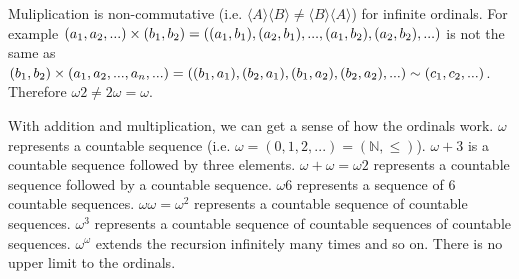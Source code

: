 \documentclass{article}
\def\ordeq{\sim}
\begin{document}

\begin{remark}
	Muliplication is non-commutative (i.e. $\langle A \rangle \langle B \rangle \neq \langle B \rangle \langle A \rangle$) for infinite ordinals. For example $(a_1, a_2, ...) \times (b_1, b_2) = ((a_1, b_1), (a_2, b_1), ..., (a_1, b_2), (a_2, b_2), \\...)$ is not the same as $(b_1, b_2) \times (a_1, a_2, ..., a_n, ...) = ((b_1, a_1), (b_2, a_1), (b_1, a_2), \\ (b_2, a_2), ...) \ordeq (c_1, c_2, ...)$. Therefore $\omega 2 \neq 2 \omega = \omega$.
	
	With addition and multiplication, we can get a sense of how the ordinals work. $\omega$ represents a countable sequence (i.e. $\omega = (0, 1, 2, ...) = (\mathbb{N}, \leq)$). $\omega +3$ is a countable sequence followed by three elements. $\omega + \omega  = \omega2$ represents a countable sequence followed by a countable sequence. $\omega6$ represents a sequence of 6 countable sequences. $\omega\omega = \omega^2$ represents a countable sequence of countable sequences. $\omega^3$ represents a countable sequence of countable sequences of countable sequences. $\omega^\omega$ extends the recursion infinitely many times and so on. There is no upper limit to the ordinals.
\end{remark}
\end{document}

